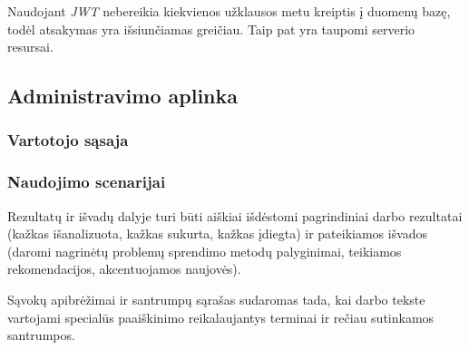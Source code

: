 \documentclass{VUMIFPSkursinis}
\begin{document}
Naudojant \textit{JWT} nebereikia kiekvienos užklausos metu kreiptis į duomenų bazę, todėl atsakymas yra išsiunčiamas greičiau. Taip pat yra taupomi serverio resursai. 

\subsection{Administravimo aplinka}

\subsubsection{Vartotojo sąsaja}

\subsubsection{Naudojimo scenarijai}

Rezultatų ir išvadų dalyje turi būti aiškiai išdėstomi pagrindiniai darbo
rezultatai (kažkas išanalizuota, kažkas sukurta, kažkas įdiegta) ir pateikiamos
išvados (daromi nagrinėtų problemų sprendimo metodų palyginimai, teikiamos
rekomendacijos, akcentuojamos naujovės).

\printbibliography[heading=bibintoc]  %

Sąvokų apibrėžimai ir santrumpų sąrašas sudaromas tada, kai darbo tekste
vartojami specialūs paaiškinimo reikalaujantys terminai ir rečiau sutinkamos
santrumpos.

\appendix  %
\end{document}
